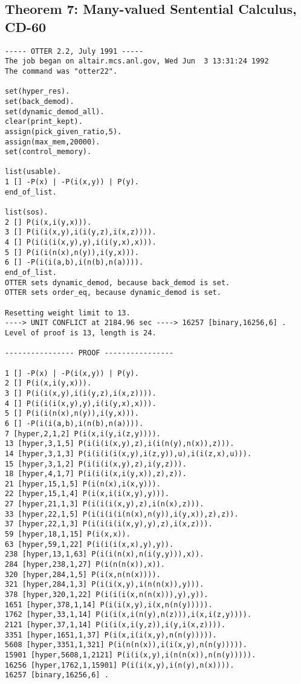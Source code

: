 \subsection{Theorem 7: Many-valued Sentential Calculus, CD-60}
{\small \begin{verbatim}
----- OTTER 2.2, July 1991 -----
The job began on altair.mcs.anl.gov, Wed Jun  3 13:31:24 1992
The command was "otter22".

set(hyper_res).
set(back_demod).
set(dynamic_demod_all).
clear(print_kept).
assign(pick_given_ratio,5).
assign(max_mem,20000).
set(control_memory).

list(usable).
1 [] -P(x) | -P(i(x,y)) | P(y).
end_of_list.

list(sos).
2 [] P(i(x,i(y,x))).
3 [] P(i(i(x,y),i(i(y,z),i(x,z)))).
4 [] P(i(i(i(x,y),y),i(i(y,x),x))).
5 [] P(i(i(n(x),n(y)),i(y,x))).
6 [] -P(i(i(a,b),i(n(b),n(a)))).
end_of_list.
OTTER sets dynamic_demod, because back_demod is set.
OTTER sets order_eq, because dynamic_demod is set.

Resetting weight limit to 13.
----> UNIT CONFLICT at 2184.96 sec ----> 16257 [binary,16256,6] .
Level of proof is 13, length is 24.

---------------- PROOF ----------------

1 [] -P(x) | -P(i(x,y)) | P(y).
2 [] P(i(x,i(y,x))).
3 [] P(i(i(x,y),i(i(y,z),i(x,z)))).
4 [] P(i(i(i(x,y),y),i(i(y,x),x))).
5 [] P(i(i(n(x),n(y)),i(y,x))).
6 [] -P(i(i(a,b),i(n(b),n(a)))).
7 [hyper,2,1,2] P(i(x,i(y,i(z,y)))).
13 [hyper,3,1,5] P(i(i(i(x,y),z),i(i(n(y),n(x)),z))).
14 [hyper,3,1,3] P(i(i(i(i(x,y),i(z,y)),u),i(i(z,x),u))).
15 [hyper,3,1,2] P(i(i(i(x,y),z),i(y,z))).
18 [hyper,4,1,7] P(i(i(i(x,i(y,x)),z),z)).
21 [hyper,15,1,5] P(i(n(x),i(x,y))).
22 [hyper,15,1,4] P(i(x,i(i(x,y),y))).
27 [hyper,21,1,3] P(i(i(i(x,y),z),i(n(x),z))).
33 [hyper,22,1,5] P(i(i(i(i(n(x),n(y)),i(y,x)),z),z)).
37 [hyper,22,1,3] P(i(i(i(i(x,y),y),z),i(x,z))).
59 [hyper,18,1,15] P(i(x,x)).
63 [hyper,59,1,22] P(i(i(i(x,x),y),y)).
238 [hyper,13,1,63] P(i(i(n(x),n(i(y,y))),x)).
284 [hyper,238,1,27] P(i(n(n(x)),x)).
320 [hyper,284,1,5] P(i(x,n(n(x)))).
321 [hyper,284,1,3] P(i(i(x,y),i(n(n(x)),y))).
378 [hyper,320,1,22] P(i(i(i(x,n(n(x))),y),y)).
1651 [hyper,378,1,14] P(i(i(x,y),i(x,n(n(y))))).
1762 [hyper,33,1,14] P(i(i(x,i(n(y),n(z))),i(x,i(z,y)))).
2121 [hyper,37,1,14] P(i(i(x,i(y,z)),i(y,i(x,z)))).
3351 [hyper,1651,1,37] P(i(x,i(i(x,y),n(n(y))))).
5608 [hyper,3351,1,321] P(i(n(n(x)),i(i(x,y),n(n(y))))).
15901 [hyper,5608,1,2121] P(i(i(x,y),i(n(n(x)),n(n(y))))).
16256 [hyper,1762,1,15901] P(i(i(x,y),i(n(y),n(x)))).
16257 [binary,16256,6] .


\end{verbatim}}
